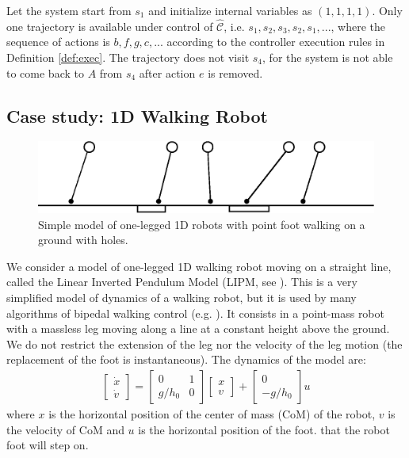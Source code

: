 Let the system start from $ s_1 $ and initialize internal variables as $ (1,1,1,1) $. Only one trajectory is available under control of $\widehat{\mathcal{C}} $, i.e. $ s_1,s_2,s_3,s_2,s_1,...$, where the sequence of actions is $ b,f,g,c,... $ according to the controller execution rules in Definition \ref{def:exec}. The trajectory does not visit $ s_4 $, for the system is not able to come back to $ A $ from $ s_4 $ after action $ e $ is removed.

\subsection{Case study: 1D {\color{black} Walking} Robot }

\begin{figure}
	\centering
	\includegraphics[width=0.5\linewidth]{pic/hop-rob}
	\caption{{\color{black} Simple model of one-legged 1D} robots with point foot {\color{black} walking} on a ground with holes. %
	}	
	\label{fig:hoprob}
\end{figure}

{\color{black} We consider a model of one-legged 1D walking robot moving on a straight line, called the Linear Inverted Pendulum Model (LIPM, see \cite{kajita20013d}). This is a very simplified model of dynamics of a walking robot, but it is used by many algorithms of bipedal walking control (e.g. \cite{englsberger2011bipedal}). It consists in a point-mass robot with a massless leg moving along a line at a constant height above the ground. We do not restrict the extension of the leg nor the velocity of the leg motion (the replacement of the foot is instantaneous). The dynamics of the model are: }
\begin{align}
\begin{bmatrix}
\dot{x}\\
\dot{v}
\end{bmatrix} = \begin{bmatrix}
0 & 1\\
g/h_0 & 0
\end{bmatrix}\begin{bmatrix}
x\\
v
\end{bmatrix}+\begin{bmatrix}
0\\-g/h_0
\end{bmatrix} u \label{eqn: model}
\end{align}
where $x$ is the {\color{black} horizontal position of the} center of mass (CoM) of the robot, $v$ is the velocity of CoM and $ u $ is {\color{black} the horizontal position of the foot.} that the robot foot will step on. 

